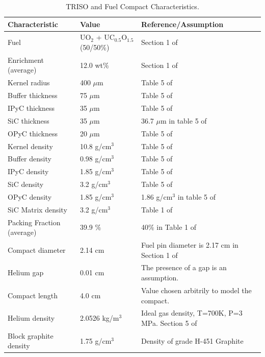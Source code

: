 \documentclass[11pt,letterpaper]{article}
\begin{document}
	\begin{table}[htbp!]
		\centering
	    \caption{TRISO and Fuel Compact Characteristics.}
	    \label{tab:compact}
		\begin{tabular}{l|l|l}
		\hline
		Characteristic              & Value             & Reference/Assumption \\ \hline
		Fuel                        & UO$_2$ + UC$_{0.5}$O$_{1.5}$ (50/50\%)  & Section 1 of \cite{hawari_development_2018} \\
		Enrichment (average)        & 12.0 wt\%         & Section 1 of \cite{hawari_development_2018}  \\
		Kernel radius               & 400 $\mu$m        & Table 5 of \cite{hawari_development_2018}  \\
		Buffer thickness            & 75 $\mu$m         & Table 5 of \cite{hawari_development_2018}  \\
		IPyC thickness              & 35 $\mu$m         & Table 5 of \cite{hawari_development_2018}  \\
		SiC thickness               & 35 $\mu$m         & 36.7 $\mu$m in table 5 of \cite{hawari_development_2018}  \\
		OPyC thickness              & 20 $\mu$m         & Table 5 of \cite{hawari_development_2018}  \\
    	Kernel density              & 10.8 g/cm$^3$     & Table 5 of \cite{hawari_development_2018}  \\
		Buffer density              & 0.98 g/cm$^3$     & Table 5 of \cite{hawari_development_2018}  \\
		IPyC density                & 1.85 g/cm$^3$     & Table 5 of \cite{hawari_development_2018}  \\
		SiC density                 & 3.2  g/cm$^3$     & Table 5 of \cite{hawari_development_2018}  \\
		OPyC density                & 1.85 g/cm$^3$     & 1.86 g/cm$^3$ in table 5 of \cite{hawari_development_2018}  \\
		SiC Matrix density          & 3.2 g/cm$^3$      & Table 1 of \cite{hawari_development_2018}  \\
		Packing Fraction (average)  & 39.9 \%           & 40\% in Table 1 of \cite{hawari_development_2018}  \\
		Compact diameter            & 2.14 cm           & Fuel pin diameter is 2.17 cm in Section 1 of \cite{hawari_development_2018}  \\
		Helium gap                  & 0.01 cm           & The presence of a gap is an assumption. \\
		Compact length              & 4.0 cm            & Value chosen arbitrily to model the compact. \\ 
        Helium density           	& 2.0526 kg/m$^3$   & Ideal gas density, T=700K, P=3 MPa. Section 5 of \cite{hawari_development_2018} \\
        Block graphite density      & 1.75 g/cm$^3$     & Density of grade H-451 Graphite \cite{gougar_prismatic_2010} \\ \hline

		\end{tabular}
	\end{table}
\end{document}
